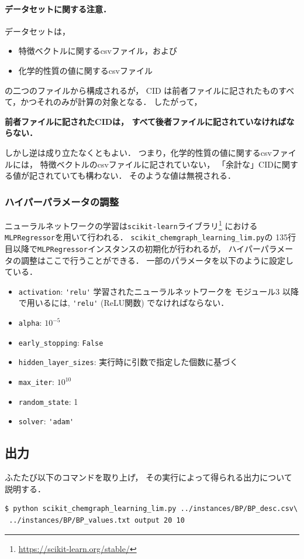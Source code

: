 \documentclass[11pt,titlepage,dvipdfmx,twoside]{jsbook}
\begin{document}
\paragraph{データセットに関する注意．}
データセットは，
\begin{itemize}
\item 特徴ベクトルに関するcsvファイル，および
\item 化学的性質の値に関するcsvファイル
\end{itemize}
の二つのファイルから構成されるが，
CID は前者ファイルに記されたものすべて，かつそれのみが計算の対象となる．
したがって，
\begin{center}
  {\bf 前者ファイルに記されたCIDは，
  すべて後者ファイルに記されていなければならない．}
\end{center}
しかし逆は成り立たなくともよい．
つまり，化学的性質の値に関するcsvファイルには，
特徴ベクトルのcsvファイルに記されていない，
「余計な」CIDに関する値が記されていても構わない．
そのような値は無視される．

\subsubsection{ハイパーパラメータの調整}
ニューラルネットワークの学習は{\tt scikit-learn}ライブラリ\footnote{\url{https://scikit-learn.org/stable/}}
における{\tt MLPRegressor}を用いて行われる．
\verb|scikit_chemgraph_learning_lim.py|の
135行目以降で\verb|MLPRegressor|インスタンスの初期化が行われるが，
ハイパーパラメータの調整はここで行うことができる．
一部のパラメータを以下のように設定している．
\begin{itemize}
\item \verb|activation|: \verb|'relu'| {\color{red}{\bf 注意:} 学習されたニューラルネットワークを モジュール3 以降で用いるには, \verb|'relu'| (ReLU関数) でなければならない．}
\item \verb|alpha|: $10^{-5}$
\item \verb|early_stopping|: \verb|False|
\item \verb|hidden_layer_sizes|: 実行時に引数で指定した個数に基づく
\item \verb|max_iter|: $10^{10}$
\item \verb|random_state|: 1
\item \verb|solver|: \verb|'adam'|
\end{itemize}

\subsection{出力}
ふたたび以下のコマンドを取り上げ，
その実行によって得られる出力について説明する．
\begin{oframed}
  {\small
    \begin{verbatim}
$ python scikit_chemgraph_learning_lim.py ../instances/BP/BP_desc.csv\
 ../instances/BP/BP_values.txt output 20 10
\end{verbatim}
}
\end{oframed}
\end{document}
